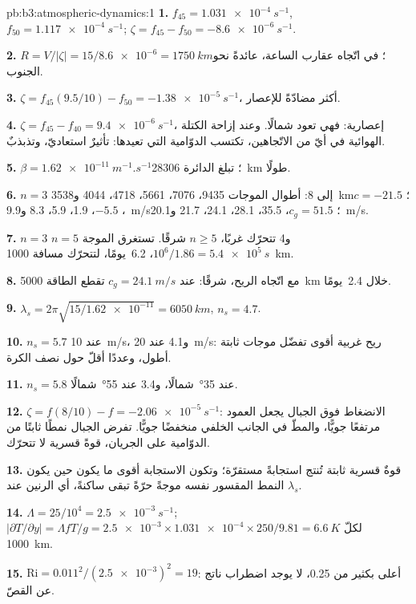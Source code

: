 \begin{solution}{pb:b3:atmospheric-dynamics:1}
\textbf{1.} $f_{45} = \qty{1.031e-4}{s^{-1}}$, $f_{50} =
\qty{1.117e-4}{s^{-1}}$; $\zeta = f_{45} - f_{50} = \qty{-8.6e-6}{s^{-1}}$.

\textbf{2.} $R = V/|\zeta| = 15/\num{8.6e-6} = \qty{1750}{km}$؛ في اتّجاه عقارب الساعة،
عائدةً نحو الجنوب.

\textbf{3.} $\zeta = f_{45}(9.5/10) - f_{50} = \qty{-1.38e-5}{s^{-1}}$، أكثر
مضادّةً للإعصار.

\textbf{4.} $\zeta = f_{45} - f_{40} = \qty{+9.4e-6}{s^{-1}}$، إعصارية: فهي
تعود شمالًا. وعند إزاحة الكتلة الهوائية في أيّ من الاتّجاهين، تكتسب الدوّامية
التي تعيدها: تأثيرٌ استعاديّ، وتذبذبٌ.

\textbf{5.} $\beta = \qty{1.62e-11}{m^{-1}.s^{-1}}$؛ تبلغ الدائرة
\qty{28306}{km} طولًا.

\textbf{6.} $n = 3$ إلى 8: أطوال الموجات 9435، 7076، 5661، 4718، 4044
و\qty{3538}{km}؛ $c = -21.5$، $-5.5$، 1.9، 5.9، 8.3 و\qty{9.9}{m/s}؛ $c_g
= 51.5$، 35.5، 28.1، 24.1، 21.7 و\qty{20.1}{m/s}.

\textbf{7.} $n = 3$ و4 تتحرّك غربًا، $n \ge 5$ شرقًا. تستغرق الموجة $n = 5$
$10^6/1.86 = \qty{5.4e5}{s}$، \num{6.2}~يومًا، لتتحرّك مسافة \qty{1000}{km}.

\textbf{8.} مع اتّجاه الريح، شرقًا: عند $c_g = \qty{24.1}{m/s}$ تقطع الطاقة
\qty{5000}{km} خلال \num{2.4}~يومًا.

\textbf{9.} $\lambda_s = 2\pi\sqrt{15/\num{1.62e-11}} = \qty{6050}{km}$,
$n_s = 4.7$.

\textbf{10.} $n_s = 5.7$ عند \qty{10}{m/s}، و4.1 عند \qty{20}{m/s}: ريح غربية
أقوى تفضّل موجات ثابتة أطول، وعددًا أقلّ حول
نصف الكرة.

\textbf{11.} $n_s = 5.8$ عند \ang{35}~شمالًا، و3.4 عند \ang{55}~شمالًا.

\textbf{12.} $\zeta = f(8/10) - f = \qty{-2.06e-5}{s^{-1}}$: الانضغاط فوق
الجبال يجعل العمود مرتفعًا جويًّا، والمطّ في الجانب الخلفي
منخفضًا جويًّا. تفرض الجبال نمطًا ثابتًا من الدوّامية على الجريان،
قوةً قسرية لا تتحرّك.

\textbf{13.} قوةٌ قسرية ثابتة تُنتج استجابةً مستقرّة؛ وتكون الاستجابة
أقوى ما يكون حين يكون النمط المقسور نفسه موجةً حرّةً تبقى
ساكنةً، أي الرنين عند $\lambda_s$.

\textbf{14.} $\Lambda = 25/10^4 = \qty{2.5e-3}{s^{-1}}$;
$|\partial T/\partial y| = \Lambda fT/g = \num{2.5e-3}\times\num{1.031e-4}
\times250/9.81 = \qty{6.6}{K}$ لكلّ \qty{1000}{km}.

\textbf{15.} $\mathrm{Ri} = 0.011^2/(\num{2.5e-3})^2 = 19$: أعلى بكثير من 0.25،
لا يوجد اضطراب ناتج عن القصّ.


\end{solution}
